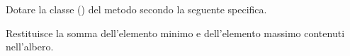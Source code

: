 Dotare la classe  () del metodo  secondo la seguente specifica.

\begin{methodslist}

 {
Restituisce la somma dell'elemento minimo e dell'elemento massimo contenuti nell'albero.
}

\end{methodslist}
